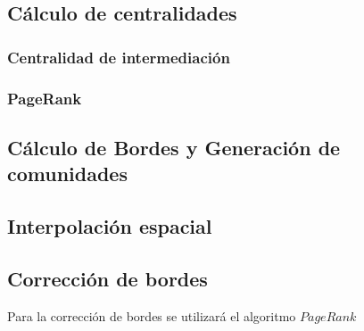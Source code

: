 \documentclass[12pt]{article}
\begin{document}
	\subsection{Cálculo de centralidades}	
		\subsubsection{Centralidad de intermediación}
		\subsubsection{PageRank}
	
	\subsection{Cálculo de Bordes y Generación de comunidades}
	\subsection{Interpolación espacial}
	
	\subsection{Corrección de bordes}  
	
	Para la corrección de bordes se utilizará el algoritmo $PageRank$
    
    \newpage
    
    
    

    
\end{document}

